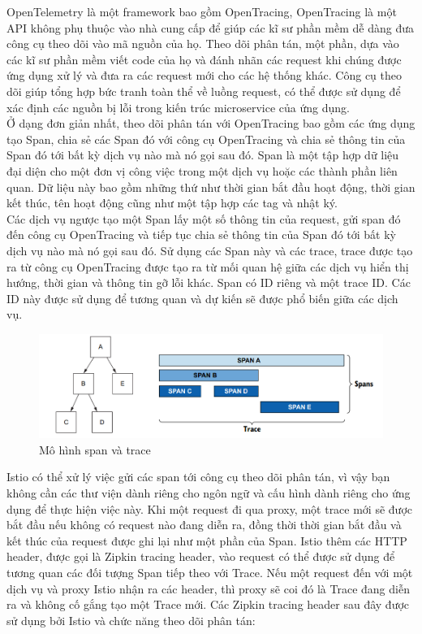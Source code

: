 \documentclass[12pt,a4paper]{report}
\begin{document}
{{		OpenTelemetry là một framework bao gồm OpenTracing, OpenTracing là một API không phụ thuộc vào nhà cung cấp để giúp các kĩ sư phần mềm dễ dàng đưa công cụ theo dõi vào mã nguồn của họ. Theo dõi phân tán, một phần, dựa vào các kĩ sư phần mềm viết code của họ và đánh nhãn các request khi chúng được ứng dụng xử lý và đưa ra các request mới cho các hệ thống khác. Công cụ theo dõi giúp tổng hợp bức tranh toàn thể về luồng request, có thể được sử dụng để xác định các nguồn bị lỗi trong kiến trúc microservice của ứng dụng.\\
		
		Ở dạng đơn giản nhất, theo dõi phân tán với OpenTracing bao gồm các ứng dụng tạo Span, chia sẻ các Span đó với công cụ OpenTracing và chia sẻ thông tin của Span đó tới bất kỳ dịch vụ nào mà nó gọi sau đó. Span là một tập hợp dữ liệu đại diện cho một đơn vị công việc trong một dịch vụ hoặc các thành phần liên quan. Dữ liệu này bao gồm những thứ như thời gian bắt đầu hoạt động, thời gian kết thúc, tên hoạt động cũng như một tập hợp các tag và nhật ký.\\
		
		Các dịch vụ ngược tạo một Span lấy một số thông tin của request, gửi span đó đến công cụ OpenTracing và tiếp tục chia sẻ thông tin của Span đó tới bất kỳ dịch vụ nào mà nó gọi sau đó. Sử dụng các Span này và các trace, trace được tạo ra từ công cụ OpenTracing được tạo ra từ mối quan hệ giữa các dịch vụ hiển thị hướng, thời gian và thông tin gỡ lỗi khác. Span có ID riêng và một trace ID. Các ID này được sử dụng để tương quan và dự kiến sẽ được phổ biến giữa các dịch vụ.
		
		\begin{figure}[h]
			\centering
			\includegraphics[width=1\linewidth]{Pics/2.3.2-p2}
			\caption{Mô hình span và trace}
			\label{fig:2}
		\end{figure}
		
		Istio có thể xử lý việc gửi các span tới công cụ theo dõi phân tán, vì vậy bạn không cần các thư viện dành riêng cho ngôn ngữ và cấu hình dành riêng cho ứng dụng để thực hiện việc này. Khi một request đi qua proxy, một trace mới sẽ được bắt đầu nếu không có request nào đang diễn ra, đồng thời thời gian bắt đầu và kết thúc của request được ghi lại như một phần của Span. Istio thêm các HTTP header, được gọi là Zipkin tracing header, vào request có thể được sử dụng để tương quan các đối tượng Span tiếp theo với Trace. Nếu một request đến với một dịch vụ và proxy Istio nhận ra các header, thì proxy sẽ coi đó là Trace đang diễn ra và không cố gắng tạo một Trace mới. Các Zipkin tracing header sau đây được sử dụng bởi Istio và chức năng theo dõi phân tán:
		
}}
\end{document}
